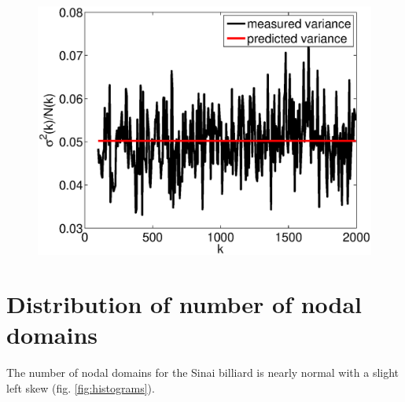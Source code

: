 \documentclass{report}
\begin{document}
\begin{figure}
  \begin{center}
    \includegraphics[width=\textwidth]{figs/results/perc_100_to_2000_variance.eps}
  \end{center}
\end{figure}

\section{Distribution of number of nodal domains}
The number of nodal domains for the Sinai billiard is nearly normal with a slight left skew (fig. \ref{fig:histograms}).
\end{document}
